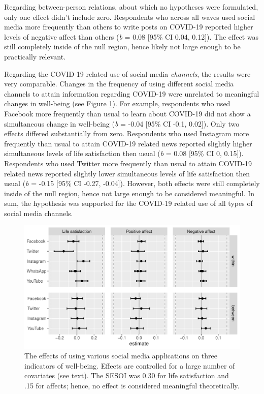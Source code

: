 \documentclass[
  english,
  man,mask,floatsintext]{apa6}
\begin{document}
Regarding between-person relations, about which no hypotheses were formulated, only one effect didn't include zero.
Respondents who across all waves used social media more frequently than others to write posts on COVID-19 reported higher levels of negative affect than others (\emph{b} = 0.08 {[}95\% CI 0.04, 0.12{]}).
The effect was still completely inside of the null region, hence likely not large enough to be practically relevant.

Regarding the COVID-19 related use of social media \emph{channels}, the results were very comparable.
Changes in the frequency of using different social media channels to attain information regarding COVID-19 were unrelated to meaningful changes in well-being (see Figure \ref{fig:res-channels}).
For example, respondents who used Facebook more frequently than usual to learn about COVID-19 did not show a simultaneous change in well-being (\emph{b} = -0.04 {[}95\% CI -0.1, 0.02{]}).
Only two effects differed substantially from zero.
Respondents who used Instagram more frequently than usual to attain COVID-19 related news reported slightly higher simultaneous levels of life satisfaction then usual (\emph{b} = 0.08 {[}95\% CI 0, 0.15{]}).
Respondents who used Twitter more frequently than usual to attain COVID-19 related news reported slightly lower simultaneous levels of life satisfaction then usual (\emph{b} = -0.15 {[}95\% CI -0.27, -0.04{]}).
However, both effects were still completely inside of the null region, hence not large enough to be considered meaningful.
In sum, the hypothesis was supported for the COVID-19 related use of all types of social media channels.

\begin{figure}
\includegraphics[width=\textwidth]{figures/fig_results_channel} \caption{The effects of using various social media applications on three indicators of well-being. Effects are controlled for a large number of covariates (see text). The SESOI was 0.30 for life satisfaction and .15 for affects; hence, no effect is considered meaningful theoretically.}\label{fig:res-channels}
\end{figure}
\end{document}
